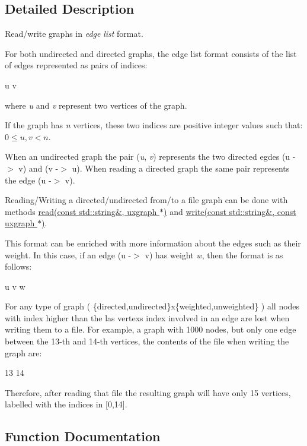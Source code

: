 \subsection{Detailed Description}
Read/write graphs in {\itshape edge} {\itshape list} format. 

For both undirected and directed graphs, the edge list format consists of the list of edges represented as pairs of indices\+: \begin{DoxyVerb}u v
\end{DoxyVerb}


where {\itshape u} and {\itshape v} represent two vertices of the graph.

If the graph has {\itshape n} vertices, these two indices are positive integer values such that\+: $0 \le u,v < n$.

When an undirected graph the pair ({\itshape u}, {\itshape v}) represents the two directed egdes (u -\/$>$ v) and (v -\/$>$ u). When reading a directed graph the same pair represents the edge (u -\/$>$ v).

Reading/\+Writing a directed/undirected from/to a file graph can be done with methods \hyperlink{namespacelgraph_1_1io_1_1edge__list_a51d3431a6910ab3120f2d12efb7c2073}{read(const std\+::string\&, uxgraph $\ast$)} and \hyperlink{namespacelgraph_1_1io_1_1edge__list_a769bbfbae588e800a54d5920ebf6f4d0}{write(const std\+::string\&, const uxgraph $\ast$)}.

This format can be enriched with more information about the edges such as their weight. In this case, if an edge (u -\/$>$ v) has weight {\itshape w}, then the format is as follows\+: \begin{DoxyVerb}u v w
\end{DoxyVerb}


For any type of graph ( \{directed,undirected\}x\{weighted,unweighted\} ) all nodes with index higher than the las vertex\textquotesingle{}s index involved in an edge are lost when writing them to a file. For example, a graph with 1000 nodes, but only one edge between the 13-\/th and 14-\/th vertices, the contents of the file when writing the graph are\+: \begin{DoxyVerb}13 14
\end{DoxyVerb}


Therefore, after reading that file the resulting graph will have only 15 vertices, labelled with the indices in \mbox{[}0,14\mbox{]}. 

\subsection{Function Documentation}
\mbox{\label{namespacelgraph_1_1io_1_1edge__list_ab421e520957c993c352796a839e38173}} 
